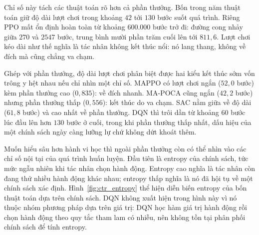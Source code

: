 \indent Chỉ số này tách các thuật toán rõ hơn cả phần thưởng. Bốn trong năm thuật toán giữ
độ dài lượt chơi trong khoảng $42$ tới $130$ bước suốt quá trình. Riêng PPO mất ổn định hoàn
toàn từ khoảng $600.000$ bước trở đi: đường cong nhảy giữa $270$ và $2547$ bước, trung bình mười
phần trăm cuối lên
tới $811{,}6$. Lượt chơi kéo dài như thế nghĩa là tác nhân không kết thúc nổi: nó lang thang,
không về đích mà cũng chẳng va chạm.

\indent Ghép với phần thưởng, độ dài lượt chơi phân biệt được hai kiểu kết thúc sớm vốn
trông y hệt nhau nếu chỉ nhìn một chỉ số. MAPPO có lượt chơi ngắn ($52{,}0$ bước) kèm phần
thưởng cao ($0{,}835$): về đích nhanh. MA-POCA cũng ngắn ($42{,}2$ bước) nhưng phần thưởng
thấp ($0{,}556$): kết thúc do va chạm. SAC nằm giữa về độ dài ($61{,}8$ bước) và cao nhất
về phần thưởng. DQN thì trôi dần từ khoảng $60$ bước lúc đầu lên hơn $130$ bước ở cuối, trong
khi phần thưởng thấp nhất, dấu hiệu của một chính sách ngày càng lưỡng lự
chứ không dứt khoát thêm.

\indent Muốn hiểu sâu hơn hành vi học thì ngoài phần thưởng còn có thể nhìn vào các chỉ số
nội tại của quá trình huấn luyện. Đầu tiên là entropy của chính sách, tức mức ngẫu nhiên
khi tác nhân chọn hành động. Entropy cao nghĩa là tác nhân còn đang thử nhiều hành động
khác nhau; entropy thấp nghĩa là nó đã hội tụ về một chính sách xác định.
Hình~\ref{fig:ctr_entropy} thể hiện diễn biến
entropy của bốn thuật toán dựa trên chính sách. DQN không xuất hiện trong hình này vì nó
thuộc nhóm phương pháp dựa trên giá trị: DQN học hàm giá trị hành động rồi chọn hành động
theo quy tắc tham lam có nhiễu, nên không tồn tại phân phối chính sách để tính entropy.


